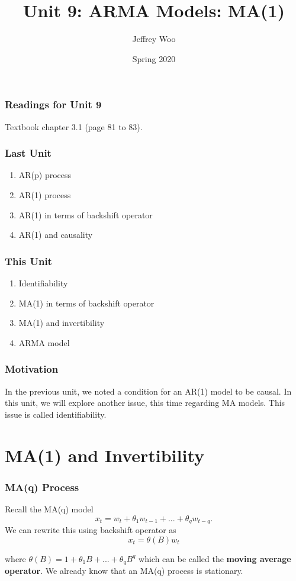 \documentclass[%
xcolor=pdftex]{beamer}
\title{Unit 9: ARMA Models: MA(1)}
\author[STAT 5170: Applied Time Series, Unit 9]{Jeffrey Woo}
\institute{Department of Statistics, University of Virginia}
\date{Spring 2020}
\begin{document}
\frame{\titlepage}


\begin{frame}
\frametitle{Readings for Unit 9}

Textbook chapter 3.1 (page 81 to 83).

\end{frame}


\begin{frame}
\frametitle{Last Unit}

\begin{enumerate}
\item AR(p) process
\item AR(1) process
\item AR(1) in terms of backshift operator
\item AR(1) and causality
\end{enumerate}

\end{frame}

\begin{frame}
\frametitle{This Unit}
\begin{enumerate}
\item Identifiability
\item MA(1) in terms of backshift operator
\item MA(1) and invertibility
\item ARMA model
\end{enumerate}
\end{frame}

\begin{frame}
\frametitle{Motivation}

In the previous unit, we noted a condition for an AR(1) model to be causal. In this unit, we will explore another issue, this time regarding MA models. This issue is called identifiability.

\end{frame}

\section{MA(1) and Invertibility}
\frame{\tableofcontents[currentsection]}

\begin{frame}
\frametitle{MA(q) Process}

Recall the MA(q) model
$$
x_t=w_t + \theta_1 w_{t-1}+...+ \theta_q w_{t-q}.
$$
We can rewrite this using backshift operator as
\begin{equation} \label{eq:MA}
x_t=\theta(B) w_t
\end{equation}

 where $\theta(B)=1+\theta_1 B+...+\theta_q B^q$ which can be called the \textbf{moving average operator}. We already know that an MA(q) process is stationary.

\end{frame}
\end{document}
